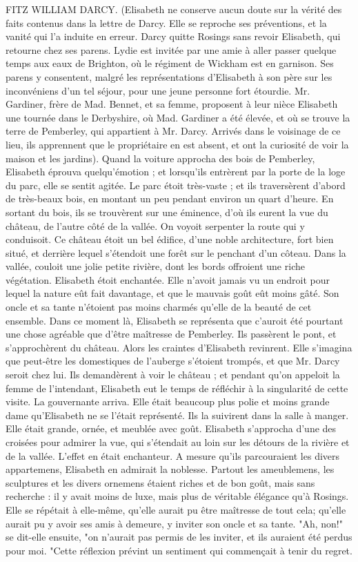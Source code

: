FITZ WILLIAM DARCY.
(Elisabeth ne conserve aucun doute sur la vérité des faits contenus dans la lettre de Darcy. Elle se reproche ses préventions, et la vanité qui l'a induite en erreur. Darcy quitte Rosings sans revoir Elisabeth, qui retourne chez ses parens. Lydie est invitée par une amie à aller passer quelque temps aux eaux de Brighton, où le régiment de Wickham est en garnison. Ses parens y consentent, malgré les représentations d'Elisabeth à son père sur les inconvéniens d'un tel séjour, pour une jeune personne fort étourdie. Mr. Gardiner, frère de Mad. Bennet, et sa femme, proposent à leur nièce Elisabeth une tournée dans le Derbyshire, où Mad. Gardiner a été élevée, et où se trouve la terre de Pemberley, qui appartient à Mr. Darcy. Arrivés dans le voisinage de ce lieu, ils apprennent que le propriétaire en est absent, et ont la curiosité de voir la maison et les jardins).
Quand la voiture approcha des bois de Pemberley, Elisabeth éprouva quelqu'émotion ;\setcounter{page}{100} et lorsqu'ils entrèrent par la porte de la loge du parc, elle se sentit agitée. Le parc étoit très-vaste ; et ils traversèrent d'abord de très-beaux bois, en montant un peu pendant environ un quart d'heure. En sortant du bois, ils se trouvèrent sur une éminence, d'où ils eurent la vue du château, de l'autre côté de la vallée. On voyoit serpenter la route qui y conduisoit. Ce château étoit un bel édifice, d'une noble architecture, fort bien situé, et derrière lequel s'étendoit une forêt sur le penchant d'un côteau. Dans la vallée, couloit une jolie petite rivière, dont les bords offroient une riche végétation. Elisabeth étoit enchantée. Elle n'avoit jamais vu un endroit pour lequel la nature eût fait davantage, et que le mauvais goût eût moins gâté. Son oncle et sa tante n'étoient pas moins charmés qu'elle de la beauté de cet ensemble. Dans ce moment là, Elisabeth se représenta que c'auroit été pourtant une chose agréable que d'être maîtresse de Pemberley. Ils passèrent le pont, et s'approchèrent du château. Alors les craintes d'Elisabeth revinrent. Elle s'imagina que peut-être les domestiques de l'auberge s'étoient trompés, et que Mr. Darcy seroit chez lui. Ils demandèrent à voir le château ; et pendant qu'on appeloit la femme de l'intendant,\setcounter{page}{101} Elisabeth eut le temps de réfléchir à la singularité de cette visite.
La gouvernante arriva. Elle était beaucoup plus polie et moins grande dame qu'Elisabeth ne se l'était représenté. Ils la suivirent dans la salle à manger. Elle était grande, ornée, et meublée avec goût. Elisabeth s'approcha d'une des croisées pour admirer la vue, qui s'étendait au loin sur les détours de la rivière et de la vallée. L'effet en était enchanteur. A mesure qu'ils parcouraient les divers appartemens, Elisabeth en admirait la noblesse. Partout les ameublemens, les sculptures et les divers ornemens étaient riches et de bon goût, mais sans recherche : il y avait moins de luxe, mais plus de véritable élégance qu'à Rosings. Elle se répétait à elle-même, qu'elle aurait pu être maîtresse de tout cela; qu'elle aurait pu y avoir ses amis à demeure, y inviter son oncle et sa tante. "Ah, non!" se dit-elle ensuite, "on n'aurait pas permis de les inviter, et ils auraient été perdus pour moi. "Cette réflexion prévint un sentiment qui commençait à tenir du regret.
